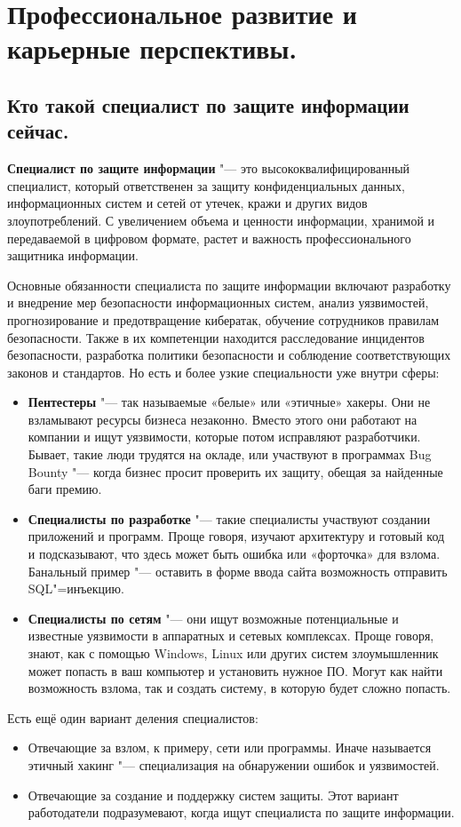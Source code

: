 \section{Профессиональное развитие и карьерные перспективы.}
\subsection{Кто такой специалист по защите информации сейчас.}
\textbf{Специалист по защите информации} "---  это высококвалифицированный специалист, который ответственен за защиту конфиденциальных 
данных, информационных систем и сетей от утечек, кражи и других видов злоупотреблений. С увеличением объема и ценности 
информации, хранимой и передаваемой в цифровом формате, растет и важность профессионального защитника информации.

Основные обязанности специалиста по защите информации включают разработку и внедрение мер безопасности информационных систем, 
анализ уязвимостей, прогнозирование и предотвращение кибератак, обучение сотрудников правилам безопасности. Также в их 
компетенции находится расследование инцидентов безопасности, разработка политики безопасности и соблюдение соответствующих 
законов и стандартов.
Но есть и более узкие специальности уже внутри сферы:
\begin{itemize}
    \item \textbf{Пентестеры} "---  так называемые «белые» или «этичные» хакеры. Они не взламывают ресурсы бизнеса незаконно. Вместо 
    этого они работают на компании и ищут уязвимости, которые потом исправляют разработчики. Бывает, такие люди трудятся на 
    окладе, или участвуют в программах Bug Bounty "---  когда бизнес просит проверить их защиту, обещая за найденные баги премию.
    \item \textbf{Специалисты по разработке} "--- такие специалисты участвуют создании приложений и программ. Проще говоря, 
    изучают архитектуру и готовый код и подсказывают, что здесь может быть ошибка или «форточка» для взлома. Банальный пример 
    "---  оставить в форме ввода сайта возможность отправить SQL"=инъекцию.
    \item \textbf{Специалисты по сетям} "---  они ищут возможные потенциальные и известные уязвимости в аппаратных и сетевых 
    комплексах. Проще говоря, знают, как с помощью Windows, Linux или других систем злоумышленник может попасть в ваш 
    компьютер и установить нужное ПО. Могут как найти возможность взлома, так и создать систему, в которую будет сложно 
    попасть.
\end{itemize}
Есть ещё один вариант деления специалистов:
\begin{itemize}
    \item Отвечающие за взлом, к примеру, сети или программы. Иначе называется этичный хакинг "---  специализация на обнаружении ошибок и уязвимостей.
    \item Отвечающие за создание и поддержку систем защиты. Этот вариант работодатели подразумевают, когда ищут специалиста по защите информации\cite{habr}.
    
\end{itemize}

